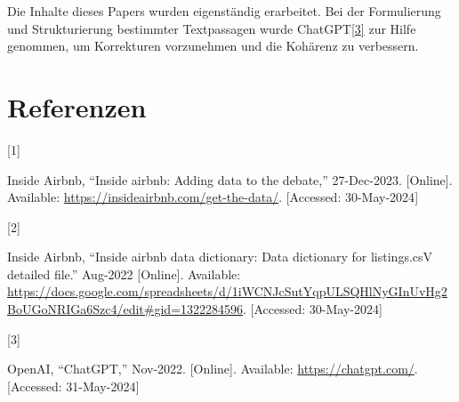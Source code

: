 \documentclass[
  journal,
]{IEEEtran}%
\newlength{\cslhangindent}
\newlength{\csllabelwidth}
\newlength{\cslentryspacingunit} %
\newenvironment{CSLReferences}[2] %
 {%
  \setlength{\parindent}{0pt}
  \ifodd #1
  \let\oldpar\par
  \def\par{\hangindent=\cslhangindent\oldpar}
  \fi
  \setlength{\parskip}{#2\cslentryspacingunit}
 }%
 {}
\newcommand{\CSLLeftMargin}[1]{\parbox[t]{\csllabelwidth}{#1}}
\newcommand{\CSLRightInline}[1]{\parbox[t]{\linewidth - \csllabelwidth}{#1}\break}
\providecommand{\bibfont}{\footnotesize}
\begin{document}
Die Inhalte dieses Papers wurden eigenständig erarbeitet. Bei der
Formulierung und Strukturierung bestimmter Textpassagen wurde
ChatGPT\protect\hyperlink{ref-openai-2022}{{[}3{]}} zur Hilfe genommen,
um Korrekturen vorzunehmen und die Kohärenz zu verbessern.

\hypertarget{referenzen}{%
\section*{Referenzen}\label{referenzen}}

\hypertarget{refs}{}
\begin{CSLReferences}{0}{0}
\leavevmode{}%
\CSLLeftMargin{{[}1{]} }%
\CSLRightInline{Inside Airbnb, {``Inside airbnb: Adding data to the
debate,''} 27-Dec-2023. {[}Online{]}. Available:
\url{https://insideairbnb.com/get-the-data/}. {[}Accessed:
30-May-2024{]}}

\leavevmode{}%
\CSLLeftMargin{{[}2{]} }%
\CSLRightInline{Inside Airbnb, {``Inside airbnb data dictionary: Data
dictionary for listings.csV detailed file.''} Aug-2022 {[}Online{]}.
Available:
\url{https://docs.google.com/spreadsheets/d/1iWCNJcSutYqpULSQHlNyGInUvHg2BoUGoNRIGa6Szc4/edit\#gid=1322284596}.
{[}Accessed: 30-May-2024{]}}

\leavevmode{}%
\CSLLeftMargin{{[}3{]} }%
\CSLRightInline{OpenAI, {``ChatGPT,''} Nov-2022. {[}Online{]}.
Available: \url{https://chatgpt.com/}. {[}Accessed: 31-May-2024{]}}

\end{CSLReferences}


\ifCLASSOPTIONcaptionsoff
  \newpage
\fi



\pagebreak[3]
\end{document}
